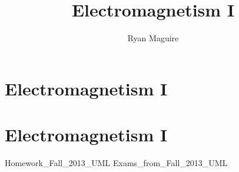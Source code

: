 \documentclass[crop=false,class=book,oneside]{standalone}
\begin{document}
    \newif\ifphysicscourseselectromagnetismI
    \ifx\ifphysicscourses\undefined
        \title{Electromagnetism I}
        \author{Ryan Maguire}
        \date{\vspace{-5ex}}
        \maketitle
        \tableofcontents
        \listoffigures
        \clearpage
        \chapter*{Electromagnetism I}
        \setcounter{chapter}{1}
    \else
        \chapter{Electromagnetism I}
    \fi
    {Homework_Fall_2013_UML}
    {Exams_from_Fall_2013_UML}
\end{document}
